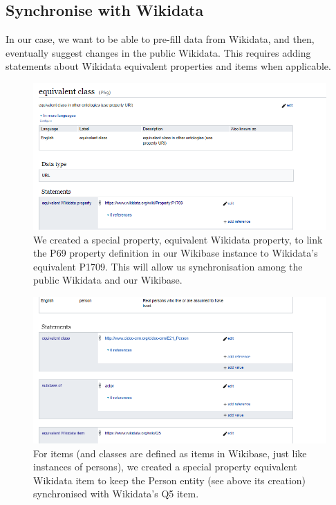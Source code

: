 \documentclass[
  letterpaper,
  DIV=11,
  numbers=noendperiod]{scrreprt}
\begin{document}
\subsection{Synchronise with Wikidata}\label{synchronise-with-wikidata}

In our case, we want to be able to pre-fill data from Wikidata, and
then, eventually suggest changes in the public Wikidata. This requires
adding statements about Wikidata equivalent properties and items when
applicable.

\begin{figure}[H]

{\centering \includegraphics{png/wikibase/edit/data_fabric_property-1.png}

}

\caption{We created a special property, equivalent Wikidata property, to
link the P69 property definition in our Wikibase instance to Wikidata's
equivalent P1709. This will allow us synchronisation among the public
Wikidata and our Wikibase.}

\end{figure}%
\begin{figure}[H]

{\centering \includegraphics{png/wikibase/edit/data_fabric_entity-2.png}

}

\caption{For items (and classes are defined as items in Wikibase, just
like instances of persons), we created a special property equivalent
Wikidata item to keep the Person entity (see above its creation)
synchronised with Wikidata's Q5 item.}

\end{figure}%
\end{document}
